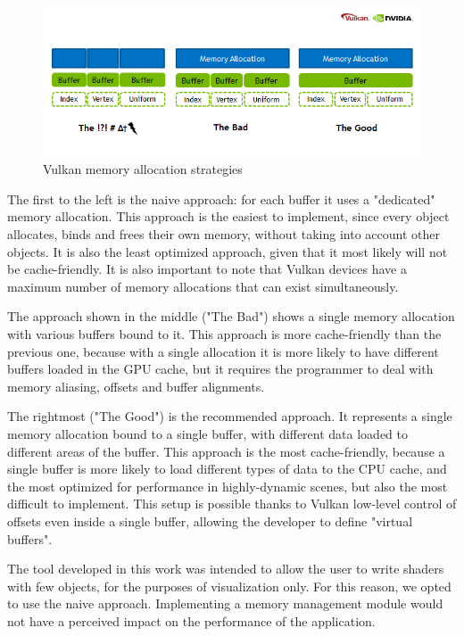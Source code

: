 \begin{figure}[ht]
    \caption{Vulkan memory allocation strategies}
    \begin{center}
        \includegraphics[width = 15cm]{figs/vulkan_memory_strategy.png}
    \end{center}
    \label{fig:vulkan_mem_alloc}
\end{figure}

The first to the left is the naive approach: for each buffer it uses a "dedicated" memory allocation. This approach is the easiest to implement, since every object allocates, binds and frees their own memory, without taking into account other objects. It is also the least optimized approach, given that it most likely will not be cache-friendly. It is also important to note that Vulkan devices have a maximum number of memory allocations that can exist simultaneously.

The approach shown in the middle ("The Bad") shows a single memory allocation with various buffers bound to it. This approach is more cache-friendly than the previous one, because with a single allocation it is more likely to have different buffers loaded in the GPU cache, but it requires the programmer to deal with memory aliasing, offsets and buffer alignments.

The rightmost ("The Good") is the recommended approach. It represents a single memory allocation bound to a single buffer, with different data loaded to different areas of the buffer. This approach is the most cache-friendly, because a single buffer is more likely to load different types of data to the CPU cache, and the most optimized for performance in highly-dynamic scenes, but also the most difficult to implement. This setup is possible thanks to Vulkan low-level control of offsets even inside a single buffer, allowing the developer to define "virtual buffers".

The tool developed in this work was intended to allow the user to write shaders with few objects, for the purposes of visualization only. For this reason, we opted to use the naive approach. Implementing a memory management module would not have a perceived impact on the performance of the application.

